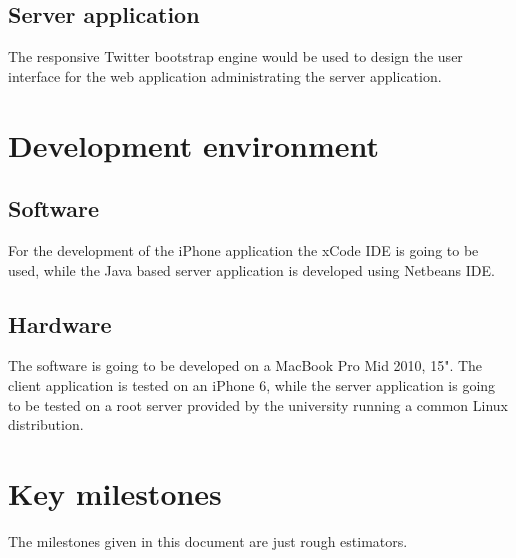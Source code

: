\section{Server application}

The responsive Twitter bootstrap engine would be used to design the user interface for the web application administrating the server application.

\chapter{Development environment}

\section{Software}

For the development of the iPhone application the xCode IDE is going to be used, while the Java based server application is developed using Netbeans IDE.

\section{Hardware}

The software is going to be developed on a MacBook Pro Mid 2010, 15". The client application is tested on an iPhone 6, while the server application is going to be tested on a root server provided by the university running a common Linux distribution.

\chapter{Key milestones}

The milestones given in this document are just rough estimators.

